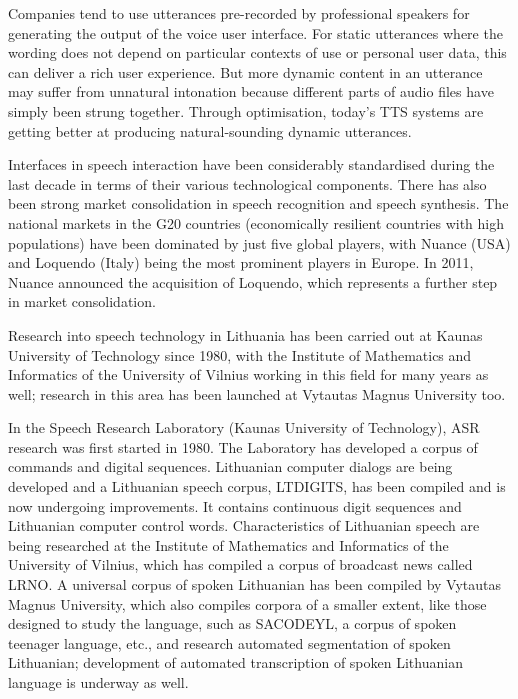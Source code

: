 \begin{multicols}{2}

Companies tend to use utterances pre-recorded by professional speakers for generating the output of the voice user interface. For static utterances where the wording does not depend on particular contexts of use or personal user data, this can deliver a rich user experience. But more dynamic content in an utterance may suffer from unnatural intonation because different parts of audio files have simply been strung together. Through optimisation, today’s TTS systems are getting better at producing natural-sounding dynamic utterances.

Interfaces in speech interaction have been considerably standardised during the last decade in terms of their various technological components. There has also been strong market consolidation in speech recognition and speech synthesis. The national markets in the G20 countries (economically resilient countries with high populations) have been dominated by just five global players, with Nuance (USA) and Loquendo (Italy) being the most prominent players in Europe. In 2011, Nuance announced the acquisition of Loquendo, which represents a further step in market consolidation.

 Research into speech technology in Lithuania has been carried out at Kaunas University of Technology since 1980, with the Institute of Mathematics and Informatics of the University of Vilnius working in this field for many years as well; research in this area has been launched at Vytautas Magnus University too.

   In the Speech Research Laboratory (Kaunas University of Technology), ASR research was first started in 1980. The Laboratory has developed a corpus of commands and digital sequences. Lithuanian computer dialogs are being developed and a Lithuanian speech corpus, LTDIGITS, has been compiled and is now undergoing improvements. It contains continuous digit sequences and Lithuanian computer control words. Characteristics of Lithuanian speech are being researched at the Institute of Mathematics and Informatics of the University of Vilnius, which has compiled a corpus of broadcast news called LRNO. A universal corpus of spoken Lithuanian has been compiled by Vytautas Magnus University, which also compiles corpora of a smaller extent, like those designed to study the language, such as SACODEYL, a corpus of  spoken teenager language, etc., and research automated segmentation of spoken Lithuanian; development of automated transcription of spoken Lithuanian language is underway as well.


\end{multicols}
